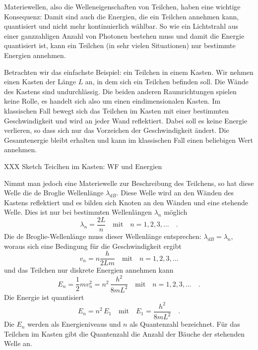  Materiewellen, also die Welleneigenschaften von Teilchen, haben eine wichtige Konsequenz: Damit sind auch die Energien, die ein Teilchen annehmen kann, quantisiert und nicht mehr kontinuierlich wählbar. So wie ein Lichtstrahl aus einer ganzzahligen Anzahl von Photonen bestehen muss und damit die Energie quantisiert ist, kann ein Teilchen (in sehr vielen Situationen) nur bestimmte Energien annehmen.

 Betrachten wir das einfachste Beispiel: ein Teilchen in einem Kasten. Wir nehmen einen Kasten der Länge $L$ an, in dem sich ein Teilchen befinden soll. Die Wände des Kastens sind undurchlässig. Die beiden anderen Raumrichtungen spielen keine Rolle, es handelt sich also um einen eindimensionalen Kasten. Im klassischen Fall bewegt sich das Teilchen im Kasten mit einer bestimmten Geschwindigkeit und wird an jeder Wand reflektiert. Dabei soll es keine Energie verlieren, so dass sich nur das Vorzeichen der Geschwindigkeit ändert. Die Gesamtenergie bleibt erhalten und kann im klassischen Fall einen beliebigen Wert annehmen.


 \begin{marginfigure}
    \caption{XXX Sketch Teiclhen im Kasten: WF und Energien}
 \end{marginfigure}

Nimmt man jedoch eine Materiewelle zur Beschreibung des Teilchens, so hat diese Welle die de Broglie Wellenlänge $\lambda_{dB}$. Diese Welle wird an den Wänden des Kastens reflektiert und es bilden sich Knoten an den Wänden und eine stehende Welle. Dies ist nur bei bestimmten Wellenlängen $\lambda_n$ möglich
\begin{equation}
    \lambda_n = \frac{2L}{n} \quad \text{mit} \quad n = 1, 2, 3, \dots \quad .
\end{equation}
Die de Broglie-Wellenlänge muss dieser Wellenlänge entsprechen: $\lambda_{dB} = \lambda_n$, woraus sich eine Bedingung für die Geschwindigkeit ergibt
\begin{equation}
    v_n = n \frac{h}{2 L m} \quad \text{mit} \quad n = 1, 2, 3, \dots
\end{equation}
und das Teilchen nur diskrete Energien annehmen kann
\begin{equation}
    E_n = \frac{1}{2} m v_n^2 = n^2 \, \frac{h^2}{8 m L^2} \quad \text{mit} \quad n = 1, 2, 3, \dots \quad .
\end{equation}
Die Energie ist quantisiert 
\begin{equation}
    E_n = n^2 \, E_1\quad \text{mit} \quad E_1 = \frac{h^2}{8 m L^2}  \quad .
\end{equation}
Die $E_n$ werden als Energieniveaus und $n$ als Quantenzahl bezeichnet. Für das Teilchen im Kasten gibt die Quantenzahl die Anzahl der Bäuche der stehenden Welle an.


